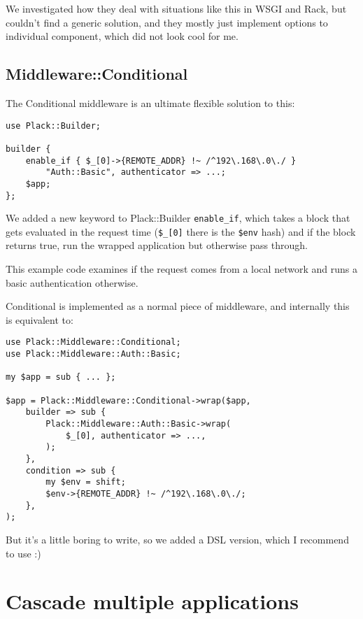We investigated how they deal with situations like this in WSGI and
Rack, but couldn't find a generic solution, and they mostly just
implement options to individual component, which did not look cool for
me.

\section{Middleware::Conditional}\label{middlewareconditional}

The Conditional middleware is an ultimate flexible solution to this:

\begin{lstlisting}
use Plack::Builder;

builder {
    enable_if { $_[0]->{REMOTE_ADDR} !~ /^192\.168\.0\./ }
        "Auth::Basic", authenticator => ...;
    $app;
};
\end{lstlisting}

We added a new keyword to Plack::Builder \lstinline!enable_if!, which
takes a block that gets evaluated in the request time (\lstinline!$_[0]!
there is the \lstinline!$env! hash) and if the block returns true, run
the wrapped application but otherwise pass through.

This example code examines if the request comes from a local network and
runs a basic authentication otherwise.

Conditional is implemented as a normal piece of middleware, and
internally this is equivalent to:

\begin{lstlisting}
use Plack::Middleware::Conditional;
use Plack::Middleware::Auth::Basic;

my $app = sub { ... };

$app = Plack::Middleware::Conditional->wrap($app,
    builder => sub {
        Plack::Middleware::Auth::Basic->wrap(
            $_[0], authenticator => ...,
        );
    },
    condition => sub {
        my $env = shift;
        $env->{REMOTE_ADDR} !~ /^192\.168\.0\./;
    },
);
\end{lstlisting}

But it's a little boring to write, so we added a DSL version, which I
recommend to use :)

\chapter{Cascade multiple
applications}\label{day-19-cascade-multiple-applications}


